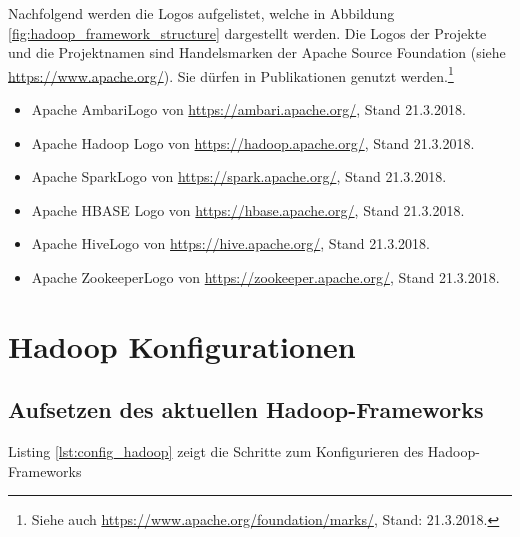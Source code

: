 \noindent
Nachfolgend werden die Logos aufgelistet, welche in Abbildung \ref{fig:hadoop_framework_structure} dargestellt werden. Die Logos der Projekte und die Projektnamen sind Handelsmarken der Apache Source Foundation (siehe \url{https://www.apache.org/}). Sie dürfen in Publikationen genutzt werden.\footnote{Siehe auch \url{https://www.apache.org/foundation/marks/}, Stand: 21.3.2018.}

\begin{itemize}
\item Apache Ambari\texttrademark\thinspace Logo von \url{https://ambari.apache.org/}, Stand 21.3.2018. 
\item Apache Hadoop\textsuperscript{\textregistered} Logo von \url{https://hadoop.apache.org/}, Stand 21.3.2018.
\item Apache Spark\texttrademark\thinspace Logo von \url{https://spark.apache.org/}, Stand 21.3.2018.
\item Apache HBASE\textsuperscript{\textregistered} Logo von \url{https://hbase.apache.org/}, Stand 21.3.2018.
\item Apache Hive\texttrademark\thinspace Logo von \url{https://hive.apache.org/}, Stand 21.3.2018.
\item Apache Zookeeper\texttrademark\thinspace Logo von \url{https://zookeeper.apache.org/}, Stand 21.3.2018.
\end{itemize}





\chapter{Hadoop Konfigurationen}
\section{Aufsetzen des aktuellen Hadoop-Frameworks}
Listing \ref{lst:config_hadoop} zeigt die Schritte zum Konfigurieren des Hadoop-Frameworks
